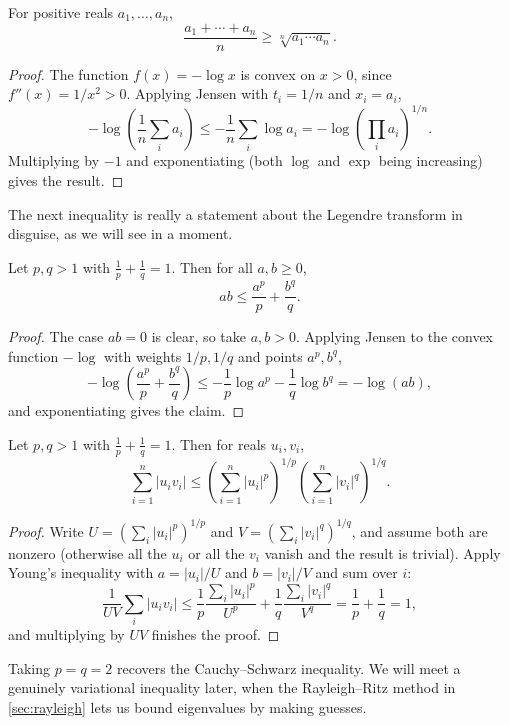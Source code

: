 \begin{corollary}[AM--GM Inequality]
	For positive reals $a_1, \dots, a_n$,
	$$
	\frac{a_1 + \cdots + a_n}{n} \geq \sqrt[n]{a_1 \cdots a_n}.
	$$
\end{corollary}
\begin{proof}
	The function $f(x) = -\log x$ is convex on $x > 0$, since $f''(x) = 1/x^2 > 0$. Applying Jensen with $t_i = 1/n$ and $x_i = a_i$,
	$$
	-\log\left(\frac{1}{n}\sum_i a_i\right) \leq -\frac{1}{n}\sum_i \log a_i = -\log\left(\prod_i a_i\right)^{1/n}.
	$$
	Multiplying by $-1$ and exponentiating (both $\log$ and $\exp$ being increasing) gives the result.
\end{proof}

The next inequality is really a statement about the Legendre transform in disguise, as we will see in a moment.

\begin{proposition}
	Let $p, q > 1$ with $\frac{1}{p} + \frac{1}{q} = 1$. Then for all $a, b \geq 0$,
	$$
	ab \leq \frac{a^p}{p} + \frac{b^q}{q}.
	$$
\end{proposition}
\begin{proof}
	The case $ab = 0$ is clear, so take $a, b > 0$. Applying Jensen to the convex function $-\log$ with weights $1/p, 1/q$ and points $a^p, b^q$,
	$$
	-\log\left(\frac{a^p}{p} + \frac{b^q}{q}\right) \leq -\frac{1}{p}\log a^p - \frac{1}{q}\log b^q = -\log(ab),
	$$
	and exponentiating gives the claim.
\end{proof}

\begin{corollary}
	Let $p, q > 1$ with $\frac 1p + \frac 1q = 1$. Then for reals $u_i, v_i$,
	$$
	\sum_{i=1}^n |u_i v_i| \leq \left(\sum_{i=1}^n |u_i|^p\right)^{1/p}\left(\sum_{i=1}^n |v_i|^q\right)^{1/q}.
	$$
\end{corollary}
\begin{proof}
	Write $U = (\sum_i |u_i|^p)^{1/p}$ and $V = (\sum_i |v_i|^q)^{1/q}$, and assume both are nonzero (otherwise all the $u_i$ or all the $v_i$ vanish and the result is trivial). Apply Young's inequality with $a = |u_i|/U$ and $b = |v_i|/V$ and sum over $i$:
	$$
	\frac{1}{UV}\sum_i |u_iv_i| \leq \frac{1}{p}\frac{\sum_i |u_i|^p}{U^p} + \frac{1}{q}\frac{\sum_i|v_i|^q}{V^q} = \frac{1}{p} + \frac{1}{q} = 1,
	$$
	and multiplying by $UV$ finishes the proof.
\end{proof}

Taking $p = q = 2$ recovers the Cauchy--Schwarz inequality. We will meet a genuinely variational inequality later, when the Rayleigh--Ritz method in \autoref{sec:rayleigh} lets us bound eigenvalues by making guesses.

